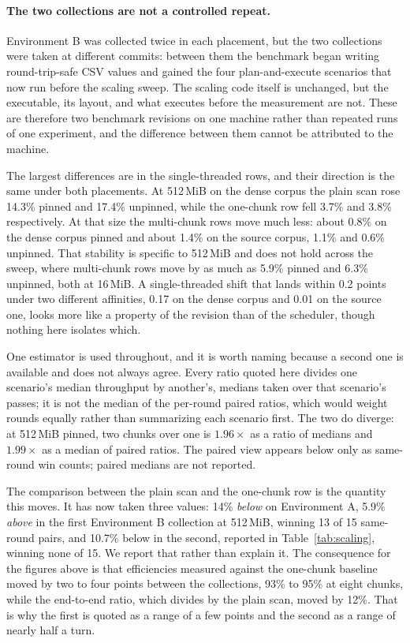 \documentclass[11pt,a4paper]{article}
\theoremstyle{definition}
\theoremstyle{plain}
\begin{document}
\paragraph{The two collections are not a controlled repeat.} Environment B was collected twice in each placement, but
the two collections were taken at different commits: between them the benchmark began writing round-trip-safe CSV
values and gained the four plan-and-execute scenarios that now run before the scaling sweep. The scaling code itself
is unchanged, but the executable, its layout, and what executes before the measurement are not. These are therefore
two benchmark revisions on one machine rather than repeated runs of one experiment, and the difference between them
cannot be attributed to the machine.

The largest differences are in the single-threaded rows, and their direction is the same under both placements. At
512\,MiB on the dense corpus the plain scan rose 14.3\% pinned and 17.4\% unpinned, while the one-chunk row fell 3.7\%
and 3.8\% respectively. At that size the multi-chunk rows move much less: about 0.8\% on the dense corpus pinned and
about 1.4\% on the source corpus, 1.1\% and 0.6\% unpinned. That stability is specific to 512\,MiB and does not hold
across the sweep, where multi-chunk rows move by as much as 5.9\% pinned and 6.3\% unpinned, both at 16\,MiB. A
single-threaded shift that lands within 0.2 points under two different affinities, 0.17 on the dense corpus and 0.01
on the source one, looks more like a property of the revision than of the scheduler, though nothing here isolates
which.

One estimator is used throughout, and it is worth naming because a second one is available and does not always agree.
Every ratio quoted here divides one scenario's median throughput by another's, medians taken over that scenario's
passes; it is not the median of the per-round paired ratios, which would weight rounds equally rather than summarizing
each scenario first. The two do diverge: at 512\,MiB pinned, two chunks over one is $1.96\times$ as a ratio of medians
and $1.99\times$ as a median of paired ratios. The paired view appears below only as same-round win counts; paired
medians are not reported.

The comparison between the plain scan and the one-chunk row is the quantity this moves. It has now taken three values:
14\% \emph{below} on Environment A, 5.9\% \emph{above} in the first Environment B collection at 512\,MiB, winning 13
of 15 same-round pairs, and 10.7\% below in the second, reported in Table~\ref{tab:scaling}, winning none of 15. We
report that rather than explain it. The consequence for the figures above is that efficiencies measured against the
one-chunk baseline moved by two to four points between the collections, 93\% to 95\% at eight chunks, while the
end-to-end ratio, which divides by the plain scan, moved by 12\%. That is why the first is quoted as a range of a few
points and the second as a range of nearly half a turn.
\end{document}
